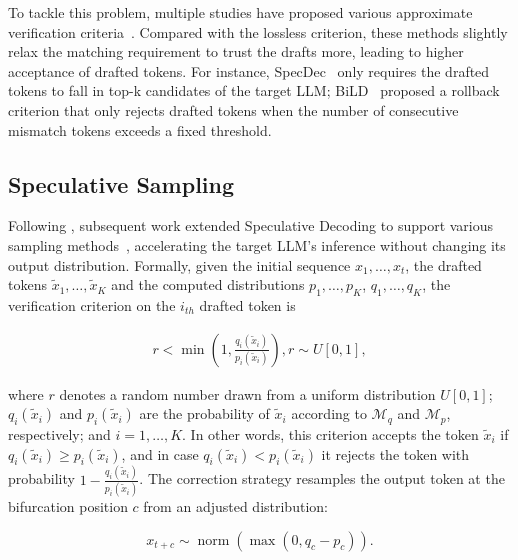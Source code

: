 To tackle this problem, multiple studies have proposed various approximate verification criteria~\cite{Stern:2018blockwise, xia:2022specdec, Kim:2023bild}. Compared with the lossless criterion, these methods slightly relax the matching requirement to trust the drafts more, leading to higher acceptance of drafted tokens. For instance, SpecDec~\cite{xia:2022specdec} only requires the drafted tokens to fall in top-k candidates of the target LLM; BiLD~\cite{Kim:2023bild} proposed a rollback criterion that only rejects drafted tokens when the number of consecutive mismatch tokens exceeds a fixed threshold.

\subsection{Speculative Sampling}
\label{sec:nucleus_sampling}
Following \citet{Stern:2019}, subsequent work extended Speculative Decoding to support various sampling methods~\cite{Leviathan:2023specdec, Chen:2023specsampling}, accelerating the target LLM's inference without changing its output distribution. Formally, given the initial sequence $x_1, \dots, x_t$, the drafted tokens $\widetilde{x}_1, \dots, \widetilde{x}_K$ and the computed distributions $p_1, \dots, p_{K}$, $q_1, \dots, q_{K}$, the verification criterion on the $i_{th}$ drafted token is

\begin{equation}
\begin{aligned}\label{eq:verify-sampling}
r < \min\left(1, \frac{q_i(\widetilde{x}_i)}{p_i(\widetilde{x}_i)}\right), r \sim U\left[0,1\right],
\end{aligned}
\end{equation}

where $r$ denotes a random number drawn from a uniform distribution $U\left[0,1\right]$; $q_i(\widetilde{x}_i)$ and $p_i(\widetilde{x}_i)$ are the probability of $\widetilde{x}_i$ according to $\mathcal{M}_q$ and $\mathcal{M}_p$, respectively; and $i=1, \dots, K$. In other words, this criterion accepts the token $\widetilde{x}_i$ if $q_i(\widetilde{x}_i) \geq p_i(\widetilde{x}_i)$, and in case $q_i(\widetilde{x}_i) < p_i(\widetilde{x}_i)$ it rejects the token with probability $1-\frac{q_i(\widetilde{x}_i)}{p_i(\widetilde{x}_i)}$. The correction strategy resamples the output token at the bifurcation position $c$ from an adjusted distribution:

\begin{equation}
x_{t+c} \sim \operatorname{norm}(\max\left(0, q_c - p_c\right)).
\end{equation}

